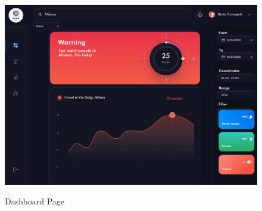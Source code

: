 \documentclass[../main.tex]{subfiles}
\begin{document}
    \begin{figure}[H]
        \centering
        \includegraphics[scale = 0.6]{assets/mockups/mock_dash.png}\\
        \caption[]{Dashboard Page}\label{fig:figure3}
    \end{figure}
\end{document}
